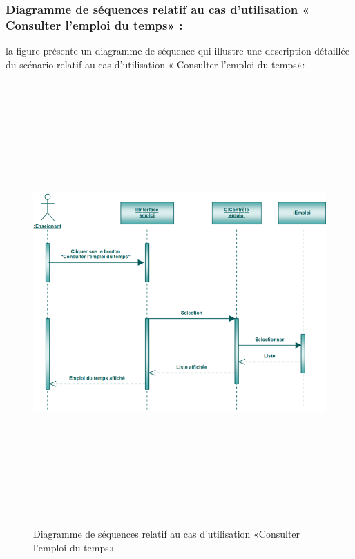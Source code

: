 \documentclass[12 pt]{report}
\begin{document}
\subsubsection{Diagramme de séquences relatif au cas d’utilisation « Consulter l'emploi du temps» :}
la figure   présente un diagramme de séquence qui illustre une description détaillée du scénario relatif au cas d’utilisation « Consulter l'emploi du temps»: 
\begin{figure}[h]
 \begin{center}
\includegraphics[width= 18 cm ,height=  17cm]{sce.PNG}
\caption{Diagramme de séquences relatif au cas d’utilisation «Consulter l'emploi du temps»}

\end{center}
\end{figure}
\end{document}
